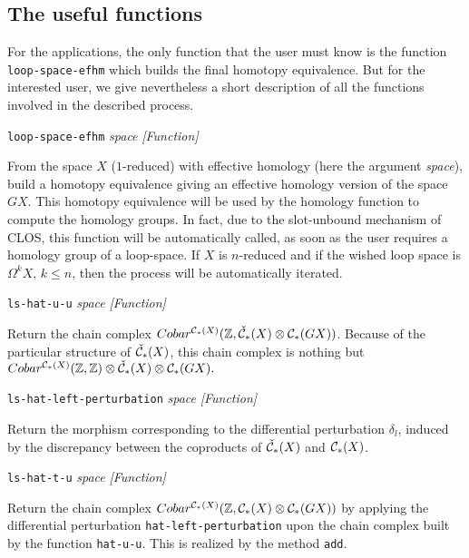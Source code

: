 \subsection {The useful functions}

For the applications, the only function that the user must know is the function {\tt loop-space-efhm}
which builds the final homotopy equivalence. But for the
interested user, we give nevertheless a short description of all the functions
involved in the described process.

\vskip 0.30cm
{\parindent=0mm
{\leftskip=5mm
{\tt loop-space-efhm} {\em space}  \hfill {\em [Function]} \par}
{\leftskip=15mm
From the space $X$ ($1$-reduced) with effective homology (here the argument {\em space}), build
a homotopy equivalence giving an effective homology version  of the space $GX$. This homotopy
equivalence will be used by the homology function to compute the homology groups. In fact, due to
the slot-unbound mechanism of CLOS, this function will be automatically called, as soon
as the user requires a homology group of a loop-space.
If $X$ is $n$-reduced and if the wished loop space is $\Omega^k X, \, k \leq n$, then
the process will be automatically  iterated. \par}
{\leftskip=5mm
{\tt ls-hat-u-u} {\em space}  \hfill {\em [Function]} \par}
{\leftskip=15mm
Return the chain complex
$Cobar^{{\cal C}_*(X)}(\mathbb{Z}, {\check{\cal C}}_*(X)\otimes {\cal C_*}(GX))$. Because of
the particular structure of ${\check{\cal C}}_*(X)$, this chain complex is nothing but
$Cobar^{{\cal C}_*(X)}(\mathbb{Z},\mathbb{Z})\otimes {\check{\cal C}}_*(X)\otimes {\cal C_*}(GX).$
\par}
{\leftskip=5mm
{\tt ls-hat-left-perturbation} {\em space}  \hfill {\em [Function]} \par}
{\leftskip=15mm
Return the morphism corresponding to the differential perturbation $\delta_l$, induced by
the discrepancy between the coproducts of  ${\check{\cal C}}_*(X)$ and ${\cal C}_*(X)$. \par}
{\leftskip=5mm
{\tt ls-hat-t-u} {\em space}  \hfill {\em [Function]} \par}
{\leftskip=15mm
Return the chain complex
$Cobar^{{\cal C}_*(X)}(\mathbb{Z}, {\cal C}_*(X)\otimes {\cal C_*}(GX))$ by applying
the differential perturbation {\tt hat-left-perturbation} upon
the chain complex built by the function {\tt hat-u-u}. This is realized by the method
{\tt add}. \par}
}
